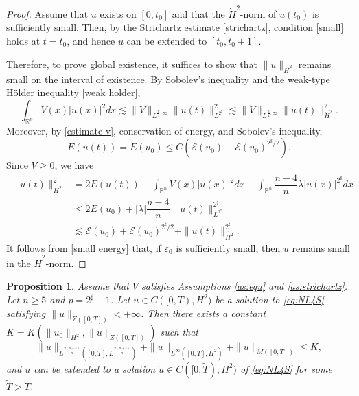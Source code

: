 \documentclass[11pt,a4paper]{article}
\numberwithin{equation}{section}
\newtheorem{proposition}[theorem]{Proposition}
\begin{document}
\begin{proof}
Assume that $u$ exists on $[0, t_{0}]$ and that the $\dot{H}^{2}$-norm of $u(t_{0})$ is sufficiently small. Then, by the Strichartz estimate \eqref{strichartz}, condition \eqref{small} holds at $t=t_{0}$, and hence $u$ can be extended to $[t_{0}, t_{0}+1]$.

Therefore, to prove global existence, it suffices to show that $\|u\|_{\dot{H}^{2}}$ remains small on the interval of existence.
By Sobolev's inequality and the weak-type H\"older inequality \eqref{weak holder},
\begin{equation}\label{estimate v}
\int_{\mathbb{R}^{n}} V(x) |u(x)|^{2} dx \lesssim \|V\|_{L^{\frac{n}{4}, \infty}}\|u(t)\|_{L^{2^{\sharp}}}^{2} \lesssim \|V\|_{L^{\frac{n}{4}, \infty}}\|u(t)\|_{\dot{H}^{2}}^{2}.
\end{equation}
Moreover, by \eqref{estimate v}, conservation of energy, and Sobolev's inequality,
\begin{equation}
E(u(t)) = E(u_{0}) \leq C(\mathcal{E}(u_{0}) + \mathcal{E}(u_{0})^{2^{\sharp}/2}).
\end{equation}
Since $V \geq 0$, we have
\begin{equation}\label{small energy}
\begin{aligned}
\|u(t)\|^{2}_{\dot{H^{2}}}
&= 2E(u(t)) - \int_{\mathbb{R}^{n}} V(x) |u(x)|^{2} dx - \int_{\mathbb{R}^{n}} \dfrac{n-4}{n}\lambda |u(x)|^{2^{\sharp}} dx\\
&\leq 2E(u_{0}) + |\lambda|\dfrac{n-4}{n}\|u(t)\|_{L^{2^{\sharp}}}^{2^{\sharp}} \\
&\lesssim \mathcal{E}(u_{0}) + \mathcal{E}(u_{0})^{2^{\sharp}/2} + \|u(t)\|_{\dot{H^{2}}}^{2^{\sharp}}.
\end{aligned}
\end{equation}
It follows from \eqref{small energy} that, if $\varepsilon_{0}$ is sufficiently small, then $u$ remains small in the $\dot{H}^{2}$-norm.
\end{proof}

\begin{proposition}\label{criterion}
Assume that $V$ satisfies Assumptions \ref{as:equ} and \ref{as:strichartz}. Let $n \geq 5$ and $p = 2^{\sharp} - 1$.
Let $u\in C([0, T), H^{2})$ be a solution to \eqref{eq:NL4S} satisfying $\|u\|_{Z([0, T])} < +\infty$.
Then there exists a constant $K = K(\|u_{0}\|_{H^{2}}, \|u\|_{Z([0, T])})$ such that
\begin{equation}\label{criterion:con:1}
\|u\|_{L^{\frac{2(n + 4)}{n}}([0, T], L^{\frac{2(n + 4)}{n}})} + \|u\|_{L^{\infty}([0, T], \dot{H^{2}})} + \|u\|_{M([0, T])} \leq K,
\end{equation}
and $u$ can be extended to a solution $\tilde{u}\in C([0, \tilde{T}), H^{2})$ of \eqref{eq:NL4S} for some $\tilde{T} > T$.
\end{proposition}
\end{document}
